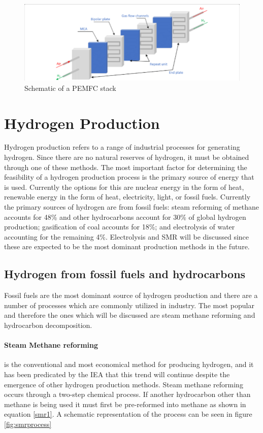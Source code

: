 \begin{figure}[H]
    \includegraphics[scale=0.5]{figures/PEMFCstack.png}
    \caption{Schematic of a PEMFC stack \cite{Li2019}}
    \label{fig:pemfcstack}
\end{figure}

\section{Hydrogen Production}
Hydrogen production refers to a range of industrial processes for generating hydrogen. 
Since there are no natural reserves of hydrogen, it must be obtained through one of these methods. The most important factor for determining the feasibility of a hydrogen production process is the primary source of energy that is used. Currently the options for this are nuclear energy in the form of heat, renewable energy in the form of heat, electricity, light, or fossil fuels. 
Currently the primary sources of hydrogen are from fossil fuels: steam reforming of methane accounts for 48\% and other hydrocarbons account for 30\% of global hydrogen production; gasification of coal accounts for 18\%; and electrolysis of water accounting for the remaining 4\%. \cite{Mangold2009} Electrolysis and SMR will be discussed since these are expected to be the most dominant production methods in the future. \cite{Holladay2009}

\subsection{Hydrogen from fossil fuels and hydrocarbons}
Fossil fuels are the most dominant source of hydrogen production \cite{Mangold2009} and there are a number of processes which are commonly utilized in industry. The most popular and therefore the ones which will be discussed are steam methane reforming and hydrocarbon decomposition.

\paragraph{Steam Methane reforming} is the conventional and most economical method for producing hydrogen, and it has been predicated by the 
IEA that this trend will continue despite the emergence of other hydrogen production methods. \cite{InternationalEnergyAgencyIEA2015}
Steam methane reforming occurs through a two-step chemical process. If another hydrocarbon other than methane is being used it must first be pre-reformed into methane as shown in equation \ref{smr1}. A schematic representation of the process can be seen in figure \ref{fig:smrprocess}

